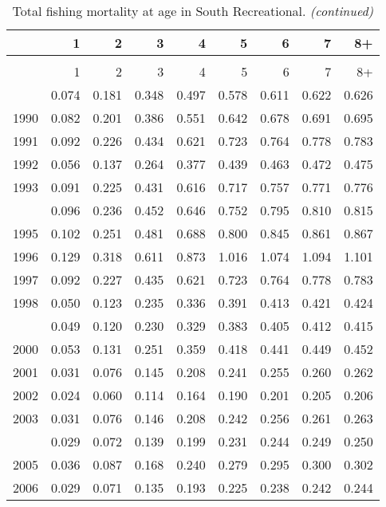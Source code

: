 \documentclass[
]{article}
\begin{document}
\begin{longtable}[t]{lrrrrrrrr}
\caption{\label{tab:South_Recreational-fleet-FAA-table}Total fishing mortality at age in South Recreational.}\\
\toprule
  & 1 & 2 & 3 & 4 & 5 & 6 & 7 & 8+\\
\midrule
\endfirsthead
\caption[]{Total fishing mortality at age in South Recreational. \textit{(continued)}}\\
\toprule
  & 1 & 2 & 3 & 4 & 5 & 6 & 7 & 8+\\
\midrule
\endhead

\endfoot
\bottomrule
\endlastfoot
1989 & 0.074 & 0.181 & 0.348 & 0.497 & 0.578 & 0.611 & 0.622 & 0.626\\
1990 & 0.082 & 0.201 & 0.386 & 0.551 & 0.642 & 0.678 & 0.691 & 0.695\\
1991 & 0.092 & 0.226 & 0.434 & 0.621 & 0.723 & 0.764 & 0.778 & 0.783\\
1992 & 0.056 & 0.137 & 0.264 & 0.377 & 0.439 & 0.463 & 0.472 & 0.475\\
1993 & 0.091 & 0.225 & 0.431 & 0.616 & 0.717 & 0.757 & 0.771 & 0.776\\
\addlinespace
1994 & 0.096 & 0.236 & 0.452 & 0.646 & 0.752 & 0.795 & 0.810 & 0.815\\
1995 & 0.102 & 0.251 & 0.481 & 0.688 & 0.800 & 0.845 & 0.861 & 0.867\\
1996 & 0.129 & 0.318 & 0.611 & 0.873 & 1.016 & 1.074 & 1.094 & 1.101\\
1997 & 0.092 & 0.227 & 0.435 & 0.621 & 0.723 & 0.764 & 0.778 & 0.783\\
1998 & 0.050 & 0.123 & 0.235 & 0.336 & 0.391 & 0.413 & 0.421 & 0.424\\
\addlinespace
1999 & 0.049 & 0.120 & 0.230 & 0.329 & 0.383 & 0.405 & 0.412 & 0.415\\
2000 & 0.053 & 0.131 & 0.251 & 0.359 & 0.418 & 0.441 & 0.449 & 0.452\\
2001 & 0.031 & 0.076 & 0.145 & 0.208 & 0.241 & 0.255 & 0.260 & 0.262\\
2002 & 0.024 & 0.060 & 0.114 & 0.164 & 0.190 & 0.201 & 0.205 & 0.206\\
2003 & 0.031 & 0.076 & 0.146 & 0.208 & 0.242 & 0.256 & 0.261 & 0.263\\
\addlinespace
2004 & 0.029 & 0.072 & 0.139 & 0.199 & 0.231 & 0.244 & 0.249 & 0.250\\
2005 & 0.036 & 0.087 & 0.168 & 0.240 & 0.279 & 0.295 & 0.300 & 0.302\\
2006 & 0.029 & 0.071 & 0.135 & 0.193 & 0.225 & 0.238 & 0.242 & 0.244\\

\end{longtable}
\end{document}
